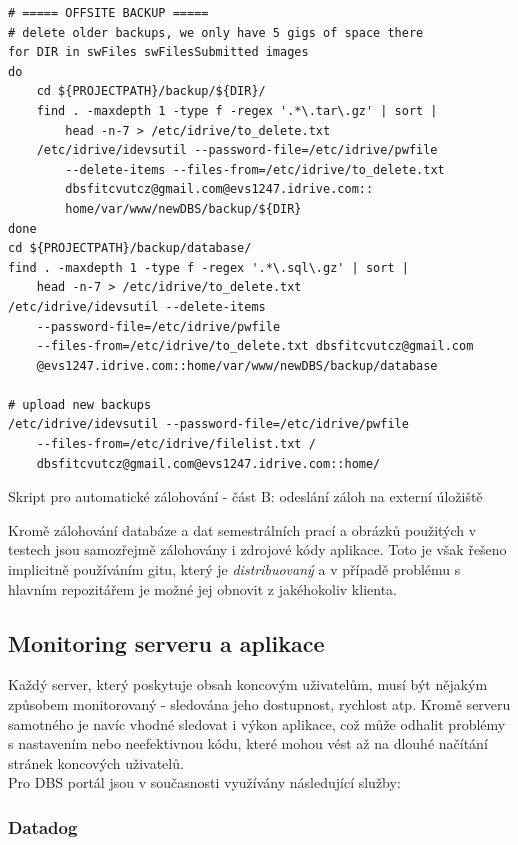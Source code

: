 \begin{listing}[H]
	\begin{verbatim}
# ===== OFFSITE BACKUP =====
# delete older backups, we only have 5 gigs of space there
for DIR in swFiles swFilesSubmitted images
do
    cd ${PROJECTPATH}/backup/${DIR}/
    find . -maxdepth 1 -type f -regex '.*\.tar\.gz' | sort |
        head -n-7 > /etc/idrive/to_delete.txt
    /etc/idrive/idevsutil --password-file=/etc/idrive/pwfile
        --delete-items --files-from=/etc/idrive/to_delete.txt
        dbsfitcvutcz@gmail.com@evs1247.idrive.com::
        home/var/www/newDBS/backup/${DIR}
done
cd ${PROJECTPATH}/backup/database/
find . -maxdepth 1 -type f -regex '.*\.sql\.gz' | sort |
    head -n-7 > /etc/idrive/to_delete.txt
/etc/idrive/idevsutil --delete-items
    --password-file=/etc/idrive/pwfile
    --files-from=/etc/idrive/to_delete.txt dbsfitcvutcz@gmail.com
    @evs1247.idrive.com::home/var/www/newDBS/backup/database

# upload new backups
/etc/idrive/idevsutil --password-file=/etc/idrive/pwfile
    --files-from=/etc/idrive/filelist.txt /
    dbsfitcvutcz@gmail.com@evs1247.idrive.com::home/
	\end{verbatim}
	\caption{Skript pro automatické zálohování - část B: odeslání záloh na externí úložiště} \label{code:backup-b}
\end{listing}
Kromě zálohování databáze a dat semestrálních prací a obrázků použitých v testech jsou samozřejmě zálohovány i zdrojové kódy aplikace. Toto je však řešeno implicitně používáním gitu, který je \emph{distribuovaný} a v případě problému s hlavním repozitářem je možné jej obnovit z jakéhokoliv klienta.

\subsection{Monitoring serveru a aplikace}

Každý server, který poskytuje obsah koncovým uživatelům, musí být nějakým způsobem monitorovaný - sledována jeho dostupnost, rychlost atp. Kromě serveru samotného je navíc vhodné sledovat i výkon aplikace, což může odhalit problémy s nastavením nebo neefektivnou kódu, které mohou vést až na dlouhé načítání stránek koncových uživatelů.\\
Pro DBS portál jsou v současnosti využívány následující služby:

\subsubsection{Datadog} \label{app:datadog}


